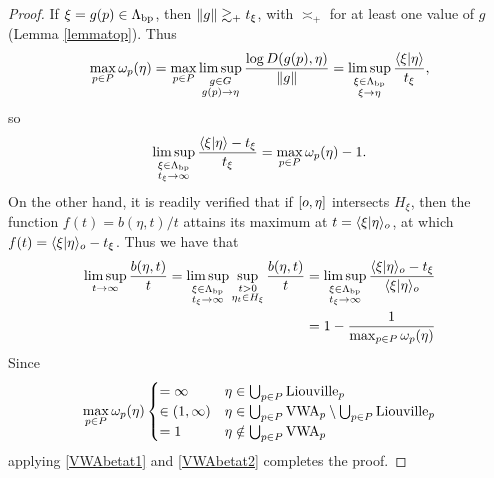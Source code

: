 \begin{proof}
If $\xi = g(p)\in\Lambda_{\mathrm{bp}}$, then $\|g\| \gtrsim_+ t_\xi$, with $\asymp_\plus$ for at least one value of $g$ (Lemma \ref{lemmatop}). Thus
\begin{align*}
\max_{p\in P}\omega_p(\eta) = \max_{p\in P}\limsup_{\substack{g\in G \\ g(p)\to\eta}} \frac{\log D(g(p),\eta)}{\|g\|}
= \limsup_{\substack{\xi\in\Lambda_{\mathrm{bp}} \\ \xi\to\eta}} \frac{\langle \xi|\eta\rangle}{t_\xi},
\end{align*}
so
\begin{equation}
\label{VWAbetat1}
\limsup_{\substack{\xi\in\Lambda_{\mathrm{bp}} \\ t_\xi\to\infty}} \frac{\langle\xi|\eta\rangle - t_\xi}{t_\xi} = \max_{p\in P}\omega_p(\eta) - 1.
\end{equation}
On the other hand, it is readily verified that if $[o,\eta]$ intersects $H_\xi$, then the function $f(t) = b(\eta,t)/t$ attains its maximum at $t = \langle \xi|\eta\rangle_o$, at which $f(t) = \langle \xi|\eta\rangle_o - t_\xi$. Thus we have that
\begin{equation}
\label{VWAbetat2}
\begin{split}
\limsup_{t\to\infty} \frac{b(\eta,t)}{t}
= \limsup_{\substack{\xi\in\Lambda_{\mathrm{bp}} \\ t_\xi\to\infty}} \sup_{\substack{t > 0 \\ \eta_t\in H_\xi}} \frac{b(\eta,t)}{t}
&= \limsup_{\substack{\xi\in\Lambda_{\mathrm{bp}} \\ t_\xi\to\infty}} \frac{\langle \xi|\eta\rangle_o - t_\xi}{\langle \xi|\eta\rangle_o}\\
&= 1 - \frac{1}{\max_{p\in P}\omega_p(\eta)}
\end{split}
\end{equation}
Since
\[
\max_{p\in P}\omega_p(\eta) \begin{cases}
= \infty & \eta\in\bigcup_{p\in P}\mathrm{Liouville}_p\\
\in (1,\infty) & \eta\in\bigcup_{p\in P}\mathrm{VWA}_p\setminus \bigcup_{p\in P}\mathrm{Liouville}_p\\
= 1 & \eta\notin\bigcup_{p\in P}\mathrm{VWA}_p
\end{cases}
\]
applying \eqref{VWAbetat1} and \eqref{VWAbetat2} completes the proof.
\end{proof}

